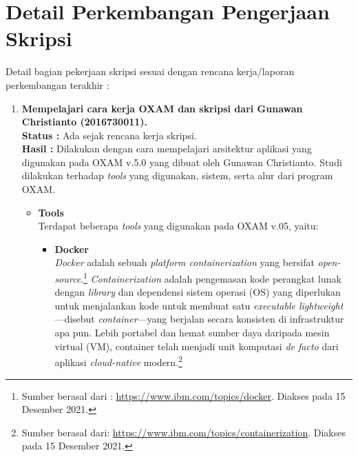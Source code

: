 \documentclass[a4paper,twoside]{article}
\begin{document}
\section{Detail Perkembangan Pengerjaan Skripsi}
Detail bagian pekerjaan skripsi sesuai dengan rencana kerja/laporan perkembangan terakhir :
	\begin{enumerate}
		\item \textbf{Mempelajari cara kerja OXAM dan skripsi dari Gunawan Christianto (2016730011).}\\
		{\bf Status :} Ada sejak rencana kerja skripsi.\\
		{\bf Hasil :} Dilakukan dengan cara mempelajari arsitektur aplikasi yang digunakan pada OXAM v.5.0 yang dibuat oleh Gunawan Christianto. Studi dilakukan terhadap \textit{tools} yang digunakan, sistem, serta alur dari program OXAM.
		
		
		\newpage
		\begin{itemize}
		    \item \textbf{Tools}\\
		    Terdapat beberapa \textit{tools} yang digunakan pada OXAM v.05, yaitu:
		    \begin{itemize}
		        \item \textbf{Docker}\\
		        \label{docker}
		        \textit{Docker} adalah sebuah \textit{platform containerization} yang bersifat \textit{open-source}.\footnote{Sumber berasal dari : \url{https://www.ibm.com/topics/docker}. Diakses pada 15 Desember 2021.} \textit{Containerization} adalah pengemasan kode perangkat lunak dengan \textit{library} dan dependensi sistem operasi (OS) yang diperlukan untuk menjalankan kode untuk membuat satu \textit{executable lightweight}—disebut \textit{container}—yang berjalan secara konsisten di infrastruktur apa pun. Lebih portabel dan hemat sumber daya daripada mesin virtual (VM), container telah menjadi unit komputasi \textit{de facto} dari aplikasi \textit{cloud-native} modern.\footnote{Sumber berasal dari: \url{https://www.ibm.com/topics/containerization}. Diakses pada 15 Desember 2021.}
		

\end{itemize}
\end{itemize}
\end{enumerate}
\end{document}
